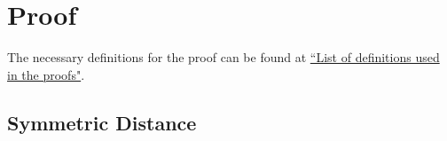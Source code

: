 \documentclass[11pt,a4paper]{article}
\theoremstyle{definition}
\newcommand{\din}{\texttt{d\_in}}
\newcommand{\dout}{\texttt{d\_out}}
\newcommand{\silvia}[1]{{ {\color{blue}{(silvia)~#1}}}}
\newcommand{\todo}{{\textcolor{red}{TODO }}}
\begin{document}


\smallskip






\section{Proof}
The necessary definitions for the proof can be found at \href{https://www.overleaf.com/project/60d214e390b337703d200982}{``List of definitions used in the proofs"}.

\subsection{Symmetric Distance}


\end{document}

